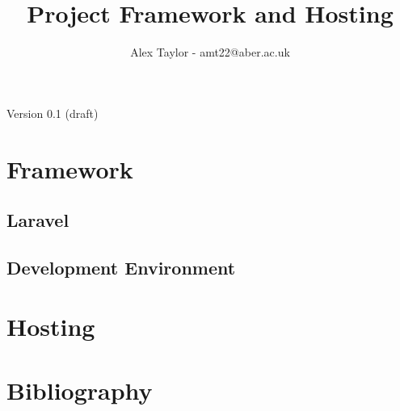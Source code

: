 \documentclass{article}
\title{Project Framework and Hosting}
\author{Alex Taylor - amt22@aber.ac.uk}
\begin{document}
\maketitle
\begin{center}
	Version 0.1 (draft)
\end{center}
\tableofcontents
\thispagestyle{empty}
\newpage

\section{Framework}
\subsection{Laravel}
\subsection{Development Environment}
\newpage

\section{Hosting}
\newpage

\section{Bibliography}


%
\end{document}
